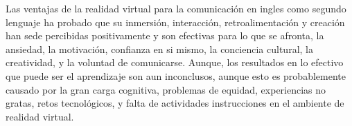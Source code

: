 Las ventajas de la realidad virtual para la comunicación en ingles como segundo lenguaje ha probado que su inmersión, interacción, retroalimentación y creación han sede percibidas positivamente y son efectivas para lo que se afronta, la ansiedad, la motivación, confianza en si mismo, la conciencia cultural, la creatividad, y la voluntad de comunicarse. Aunque, los resultados en lo efectivo que puede ser el aprendizaje son aun inconclusos, aunque esto es probablemente causado por la gran carga cognitiva, problemas de equidad, experiencias no gratas, retos tecnológicos, y falta de actividades instrucciones en el ambiente de realidad virtual. \parencite{YUDINTSEVA2023100018}
